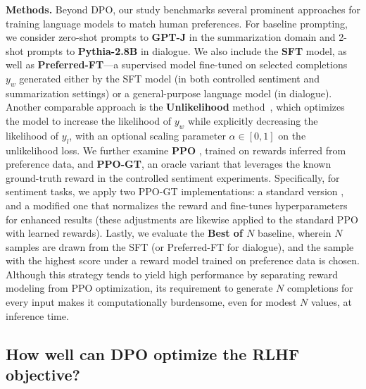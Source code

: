 \textbf{Methods.} Beyond DPO, our study benchmarks several prominent approaches for training language models to match human preferences. For baseline prompting, we consider zero-shot prompts to \textbf{GPT-J} \citep{gpt-j} in the summarization domain and 2-shot prompts to \textbf{Pythia-2.8B} \citep{biderman2023pythia} in dialogue. We also include the \textbf{SFT} model, as well as \textbf{Preferred-FT}—a supervised model fine-tuned on selected completions $y_w$ generated either by the SFT model (in both controlled sentiment and summarization settings) or a general-purpose language model (in dialogue). Another comparable approach is the \textbf{Unlikelihood} method~\citep{welleck2019neural}, which optimizes the model to increase the likelihood of $y_w$ while explicitly decreasing the likelihood of $y_l$, with an optional scaling parameter $\alpha\in[0,1]$ on the unlikelihood loss. We further examine \textbf{PPO} \citep{schulman2017proximal}, trained on rewards inferred from preference data, and \textbf{PPO-GT}, an oracle variant that leverages the known ground-truth reward in the controlled sentiment experiments. Specifically, for sentiment tasks, we apply two PPO-GT implementations: a standard version \cite{leandro_von_werra_2023_7790115}, and a modified one that normalizes the reward and fine-tunes hyperparameters for enhanced results (these adjustments are likewise applied to the standard PPO with learned rewards). Lastly, we evaluate the \textbf{Best of $N$} baseline, wherein $N$ samples are drawn from the SFT (or Preferred-FT for dialogue), and the sample with the highest score under a reward model trained on preference data is chosen. Although this strategy tends to yield high performance by separating reward modeling from PPO optimization, its requirement to generate $N$ completions for every input makes it computationally burdensome, even for modest $N$ values, at inference time.

\subsection{How well can DPO optimize the RLHF objective?}

